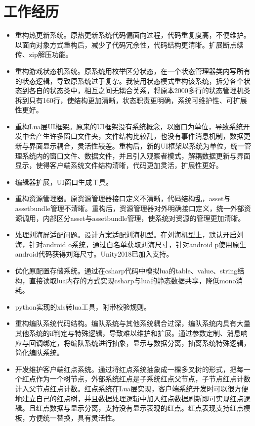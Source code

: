 \documentclass{resume}
\begin{document}
\section{工作经历}
\begin{itemize}
  \item 重构热更新系统。原热更新系统代码偏面向过程，代码重复度高，不便维护。以面向对象方式重构后，减少了代码冗余性，代码结构更清晰。扩展断点续传、zip解压功能。
  \item 重构游戏状态机系统。原系统用枚举区分状态，在一个状态管理器类内写所有的状态逻辑，导致原系统过于复杂。我使用状态模式重构该系统，拆分各个状态到各自的状态类中，相互之间无耦合关系，将原本2000多行的状态管理机类拆到只有160行，使结构更加清晰，状态职责更明确，系统可维护性、可扩展性更好。
  \item 重构Lua层UI框架。原来的UI框架没有系统概念，以窗口为单位，导致系统开发中会产生许多窗口文件夹，文件结构比较乱，也没有事件消息机制，数据更新与界面显示耦合，灵活性较差。重构后，新的UI框架以系统为单位，统一管理系统内的窗口文件、数据文件，并且引入观察者模式，解耦数据更新与界面显示，使得客户端系统文件结构清晰，代码更加灵活，扩展性更好。
  \item 编辑器扩展，UI窗口生成工具。
  \item 重构资源管理器。原资源管理器接口定义不清晰，代码结构乱，asset与assetbundle管理不清晰。重构后，资源管理器对外明确接口定义，统一外部资源调用，内部区分asset与assetbundle管理，使系统对资源的管理更加清晰。
  \item 处理刘海屏适配问题。设计方案适配刘海机型。在刘海机型上，默认开启刘海，针对android o系统，通过白名单获取刘海尺寸，针对android p使用原生android代码获得刘海尺寸。Unity2018已加入支持。
  \item 优化原配置存储系统。通过在csharp代码中模拟lua的table、value、string结构，直接读取lua内存的方式实现csharp与lua的静态数据共享，降低mono消耗。
  \item python实现的xls转lua工具，附带校验规则。
  \item 重构编队系统代码结构。编队系统与其他系统耦合过深，编队系统内具有大量其他系统的if判定与特殊逻辑，导致难以维护和扩展。通过参数定制、消息响应与回调绑定，将编队系统进行抽象，显示与数据分离，抽离系统特殊逻辑，简化编队系统。
  \item 开发维护客户端红点系统。通过将红点系统抽象成一棵多叉树的形式，把每一个红点作为一个树节点，外部系统红点是子系统红点父节点，子节点红点计数计入父节点红点计数。红点系统在Lua层实现，客户端系统开发时可以很方便地建立自己的红点树，并且数据处理逻辑中加入红点数据刷新即可实现红点逻辑。且红点数据与显示分离，支持没有显示表现的红点。红点表现支持红点模板，方便统一替换，具有灵活性。

\end{itemize}
\end{document}
